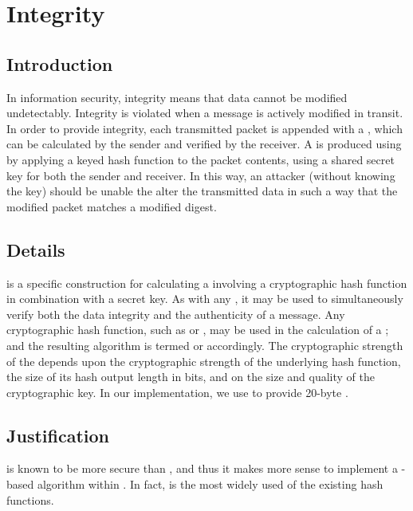 \documentclass[a4paper,11pt]{article}
\begin{document}
\section{Integrity}

\subsection{Introduction}
In information security, integrity means that data cannot be modified
undetectably. Integrity is violated when a message is actively modified in
transit. In order to provide integrity, each transmitted packet is appended with
a , which can be calculated by the
sender and verified by the receiver. A  is produced using by
applying a keyed hash function to the packet contents, using a shared secret key
for both the sender and receiver. In this way, an attacker (without knowing the
key) should be unable the alter the transmitted data in such a way that the
modified packet matches a modified  digest.

\subsection{Details}
 is a specific
construction for calculating a 
involving a cryptographic hash function in combination with a secret key. As
with any , it may be used to simultaneously verify both the data
integrity and the authenticity of a message. Any cryptographic hash function,
such as  or , may be used in the calculation of
a ; and the resulting  algorithm is termed
 or  accordingly. The cryptographic
strength of the  depends upon the cryptographic strength of the
underlying hash function, the size of its hash output length in bits, and on the
size and quality of the cryptographic key. In our implementation, we use
 to provide 20-byte
.

\subsection{Justification}
 is known to be more secure than , and thus it
makes more sense to implement a -based 
algorithm within \packageName{}. In fact,  is the most widely
used of the existing  hash functions.
\end{document}
